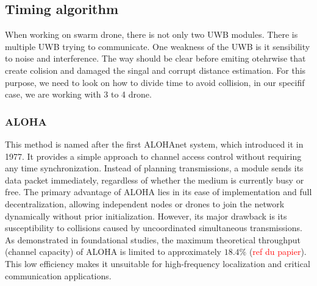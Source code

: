 \subsection{Timing algorithm}\label{UWB_Algo_timings}
When working on swarm drone, there is not only two UWB modules. There is multiple UWB trying to communicate. One weakness of the UWB is it sensibility to noise and interference. The way should be clear before emiting otehrwise that create colision and damaged the singal and corrupt distance estimation.
For this purpose, we need to look on how to divide time to avoid collision, in our specifif case, we are working with 3 to 4 drone.
\subsubsection{ALOHA}
This method is named after the first ALOHAnet system, which introduced it in 1977. It provides a simple approach to channel access control without requiring any time synchronization. Instead of planning transmissions, a module sends its data packet immediately, regardless of whether the medium is currently busy or free.
The primary advantage of  ALOHA lies in its ease of implementation and full decentralization, allowing independent nodes or drones to join the network dynamically without prior initialization. 
However, its major drawback is its susceptibility to collisions caused by uncoordinated simultaneous transmissions. As demonstrated in foundational studies, the maximum theoretical throughput (channel capacity) of  ALOHA is limited to approximately $18.4\%$ (\textcolor{red}{ref du papier}). This low efficiency makes it unsuitable for high-frequency localization and critical communication applications.


